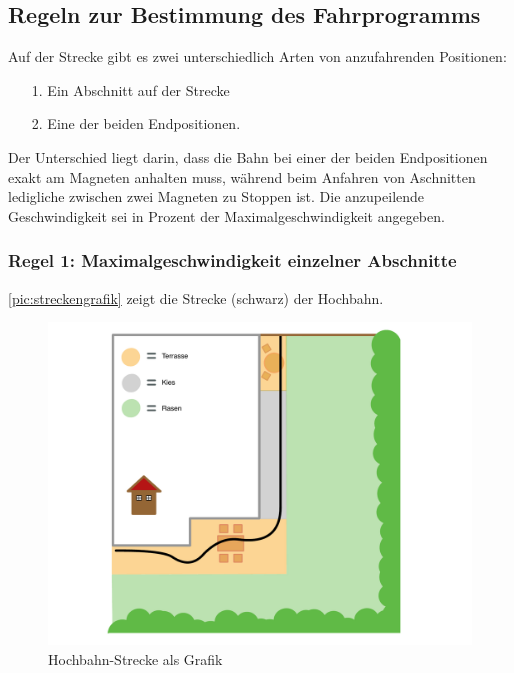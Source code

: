 \subsection{Regeln zur Bestimmung des Fahrprogramms}
Auf der Strecke gibt es zwei unterschiedlich Arten von anzufahrenden Positionen:
\begin{center}
	\begin{itemize}
		\item [1.] Ein Abschnitt auf der Strecke
		\item [2.] Eine der beiden Endpositionen.
	\end{itemize}
\end{center}
Der Unterschied liegt darin, dass die Bahn bei einer der beiden Endpositionen exakt am Magneten anhalten muss, während beim Anfahren von Aschnitten ledigliche zwischen zwei Magneten zu Stoppen ist. Die anzupeilende Geschwindigkeit sei in Prozent der Maximalgeschwindigkeit angegeben.
\newpage 
\subsubsection{Regel 1: Maximalgeschwindigkeit einzelner Abschnitte}
\autoref{pic:streckengrafik} zeigt die Strecke (schwarz) der Hochbahn.

\begin{figure}[h]
	\begin{center}
		\includegraphics[width = \textwidth]{Streckengrafik.pdf}
		\caption{\label{pic:streckengrafik} Hochbahn-Strecke als Grafik}
	\end{center}
\end{figure}

